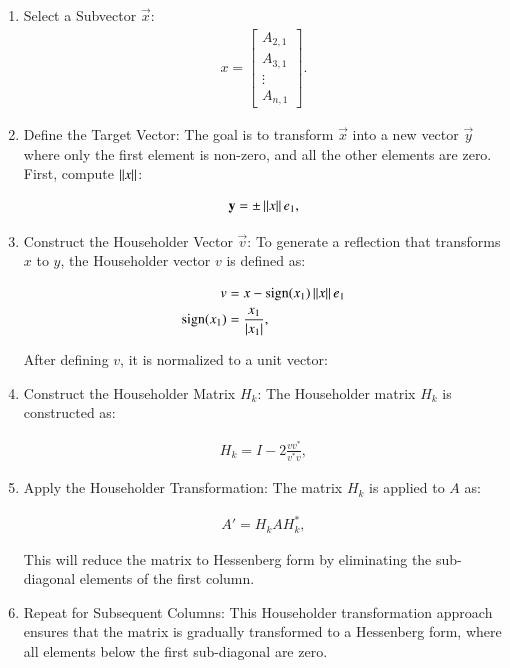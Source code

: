 \documentclass[journal, article]{IEEEtran}
\begin{document}
\begin{enumerate}
	\item Select a Subvector $\vec{x}$:
\begin{align}
	x = \begin{bmatrix}
		A_{2,1} \\
		A_{3,1} \\
		\vdots \\
		A_{n,1}
	\end{bmatrix}.
\end{align}

\item Define the Target Vector:
	The goal is to transform $\vec{x}$ into a new vector $\vec{y}$ where only the first element is non-zero, and all the other elements are zero. First, compute $\left\lVert x\right\rVert$:

		\begin{align}
			\mathbf{y} = \pm \left\lVert x\right\rVert e_1,
		\end{align}

\item Construct the Householder Vector $\vec{v}$:
	To generate a reflection that transforms \( x \) to \( y \), the Householder vector \( v \) is defined as:

		\begin{align}
			v &= x - \text{sign}(x_1) \left\lVert x\right\rVert e_1\\
			\text{sign}(x_1) &= \frac{x_1}{|x_1|},
		\end{align}

	After defining \( v \), it is normalized to a unit vector:

\item Construct the Householder Matrix \( H_k \):
	The Householder matrix \( H_k \) is constructed as:

		\begin{align}
		H_k = I - 2 \frac{v v^*}{v^* v},
		\end{align}

\item Apply the Householder Transformation:
	The matrix \( H_k \) is applied to \( A \) as:

		\begin{align}
		A' = H_k A H_k^*,
		\end{align}

	This will reduce the matrix to Hessenberg form by eliminating the sub-diagonal elements of the first column.

\item Repeat for Subsequent Columns:
	This Householder transformation approach ensures that the matrix is gradually transformed to a Hessenberg form, where all elements below the first sub-diagonal are zero.
\end{enumerate}
\end{document}
